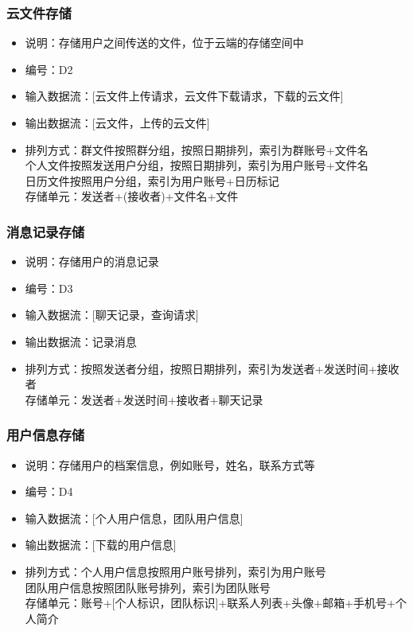             \subsubsection{云文件存储}
            \begin{itemize}
                \item 说明：存储用户之间传送的文件，位于云端的存储空间中
                \item 编号：D2
                \item 输入数据流：[云文件上传请求，云文件下载请求，下载的云文件]
                \item 输出数据流：[云文件，上传的云文件]
                \item 排列方式：群文件按照群分组，按照日期排列，索引为群账号+文件名\\
                               个人文件按照发送用户分组，按照日期排列，索引为用户账号+文件名\\
                               日历文件按照用户分组，索引为用户账号+日历标记\\
                               存储单元：发送者+(接收者)+文件名+文件\\
            \end{itemize}
            \subsubsection{消息记录存储}
            \begin{itemize}
                \item 说明：存储用户的消息记录
                \item 编号：D3
                \item 输入数据流：[聊天记录，查询请求]
                \item 输出数据流：记录消息
                \item 排列方式：按照发送者分组，按照日期排列，索引为发送者+发送时间+接收者\\
                         存储单元：发送者+发送时间+接收者+聊天记录\\
            \end{itemize}
            \subsubsection{用户信息存储}
            \begin{itemize}
                \item 说明：存储用户的档案信息，例如账号，姓名，联系方式等
                \item 编号：D4
                \item 输入数据流：[个人用户信息，团队用户信息]
                \item 输出数据流：[下载的用户信息]
                \item 排列方式：个人用户信息按照用户账号排列，索引为用户账号\\
                               团队用户信息按照团队账号排列，索引为团队账号\\
                               存储单元：账号+[个人标识，团队标识]+联系人列表+头像+邮箱+手机号+个人简介\\
            \end{itemize}
